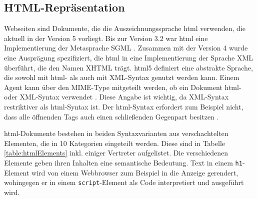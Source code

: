         \subsection{HTML-Repräsentation}
            Webseiten sind Dokumente, die die Auszeichnungssprache \gls{html} verwenden,
            die aktuell in der Version 5 \cite{w3c:html5} vorliegt.
            Bis zur Version 3.2 war \gls{html} eine Implementierung der Metasprache SGML \cite[Kapitel 3]{w3c:html401}.
            Zusammen mit der Version 4 \cite{w3c:xhtml} wurde eine Ausprägung spezifiziert,
            die \gls{html} in eine Implementierung der Sprache XML überführt,
            die den Namen XHTML trägt.
            \gls{html}5 \cite[Kapitel 1.6]{w3c:html5} definiert eine abstrakte Sprache,
            die sowohl mit \gls{html}- als auch mit XML-Syntax genutzt werden kann.
            Einem Agent kann über den MIME-Type mitgeteilt werden,
            ob ein Dokument \gls{html}- oder XML-Syntax verwendet \cite[Kapitel 1.6]{w3c:html5}.
            Diese Angabe ist wichtig, da XML-Syntax restriktiver als \gls{html}-Syntax ist.
            Der \gls{html}-Syntax erfordert zum Beispiel nicht,
            dass alle öffnenden Tags auch einen schließenden Gegenpart besitzen
            \cite[Kapitel 3.2.3]{w3c:html5}.

            \gls{html}-Dokumente bestehen in beiden Syntaxvarianten aus verschachtelten
            Elementen, die in 10 Kategorien \cite[Kapitel 4]{w3c:html5} eingeteilt werden.
            Diese sind in Tabelle \ref{table:htmlElements} inkl. einiger Vertreter aufgelistet.
            Die verschiedenen Elemente geben ihren Inhalten eine semantische Bedeutung.
            Text in einem \texttt{h1}-Element \cite[Kapitel 4.3.6]{w3c:html5} wird von einem Webbrowser zum Beispiel in die Anzeige gerendert,
            wohingegen er in einem \texttt{script}-Element \cite[Kapitel 4.11.1]{w3c:html5} als Code interpretiert und ausgeführt wird.

